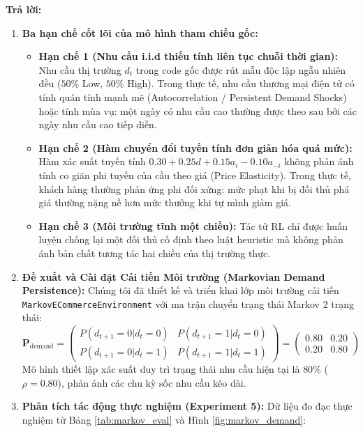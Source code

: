\documentclass[12pt,a4paper]{article}
\begin{document}
\textbf{Trả lời:}
\begin{enumerate}
    \item \textbf{Ba hạn chế cốt lõi của mô hình tham chiếu gốc:}
    \begin{itemize}
        \item \textbf{Hạn chế 1 (Nhu cầu i.i.d thiếu tính liên tục chuỗi thời gian):} Nhu cầu thị trường $d_t$ trong code gốc được rút mẫu độc lập ngẫu nhiên đều ($50\%$ Low, $50\%$ High). Trong thực tế, nhu cầu thương mại điện tử có tính quán tính mạnh mẽ (Autocorrelation / Persistent Demand Shocks) hoặc tính mùa vụ: một ngày có nhu cầu cao thường được theo sau bởi các ngày nhu cầu cao tiếp diễn.
        \item \textbf{Hạn chế 2 (Hàm chuyển đổi tuyến tính đơn giản hóa quá mức):} Hàm xác suất tuyến tính $0.30 + 0.25 d + 0.15 a_i - 0.10 a_{-i}$ không phản ánh tính co giãn phi tuyến của cầu theo giá (Price Elasticity). Trong thực tế, khách hàng thường phản ứng phi đối xứng: mức phạt khi bị đối thủ phá giá thường nặng nề hơn mức thưởng khi tự mình giảm giá.
        \item \textbf{Hạn chế 3 (Môi trường tĩnh một chiều):} Tác tử RL chỉ được huấn luyện chống lại một đối thủ cố định theo luật heuristic mà không phản ánh bản chất tương tác hai chiều của thị trường thực.
    \end{itemize}
    \item \textbf{Đề xuất và Cài đặt Cải tiến Môi trường (Markovian Demand Persistence):}
    Chúng tôi đã thiết kế và triển khai lớp môi trường cải tiến \texttt{MarkovECommerceEnvironment} với ma trận chuyển trạng thái Markov 2 trạng thái:
    \begin{equation}
    \mathbf{P}_{\text{demand}} = \begin{pmatrix} 
    P(d_{t+1}=0 | d_t=0) & P(d_{t+1}=1 | d_t=0) \\ 
    P(d_{t+1}=0 | d_t=1) & P(d_{t+1}=1 | d_t=1) 
    \end{pmatrix} = \begin{pmatrix} 
    0.80 & 0.20 \\ 
    0.20 & 0.80 
    \end{pmatrix}
    \end{equation}
    Mô hình thiết lập xác suất duy trì trạng thái nhu cầu hiện tại là $80\%$ ($\rho = 0.80$), phản ánh các chu kỳ sốc nhu cầu kéo dài.
    \item \textbf{Phân tích tác động thực nghiệm (Experiment 5):}
    Dữ liệu đo đạc thực nghiệm từ Bảng \ref{tab:markov_eval} và Hình \ref{fig:markov_demand}:

\end{enumerate}
\end{document}
